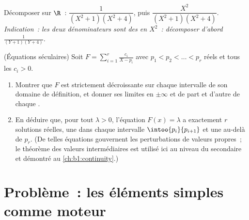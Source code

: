 \begin{exercise}[$\star\star$]\label{exo:b1:fractions:11}
Décomposer sur $\R$~: $\dfrac{1}{(X^2+1)(X^2+4)}$, puis
$\dfrac{X^2}{(X^2+1)(X^2+4)}$. \emph{Indication~: les deux dénominateurs
sont des  en $X^2$~: décomposer d'abord
$\frac1{(Y+1)(Y+4)}$.}
\end{exercise}

\begin{exercise}[$\star\star\star$]\label{exo:b1:fractions:12}
(Équations séculaires) Soit $F = \sum_{i=1}^{r} \frac{c_i}{X - p_i}$
avec $p_1 < p_2 < \dots < p_r$ réels et tous les $c_i > 0$.
\begin{enumerate}
  \item Montrer que $F$ est strictement décroissante sur chaque
        intervalle de son domaine de définition, et donner ses limites
        en $\pm\infty$ et de part et d'autre de chaque .
  \item En déduire que, pour tout $\lambda > 0$, l'équation $F(x) =
        \lambda$ a exactement $r$ solutions réelles, une dans chaque
        intervalle $\intoo{p_i}{p_{i+1}}$ et une au-delà de $p_r$.
        (De telles équations gouvernent les perturbations de valeurs
        propres~; le théorème des valeurs intermédiaires est utilisé
        ici au niveau du secondaire et démontré au
        \cref{ch:b1:continuity}.)
\end{enumerate}
\end{exercise}

\section{Problème~: les éléments simples comme moteur}


